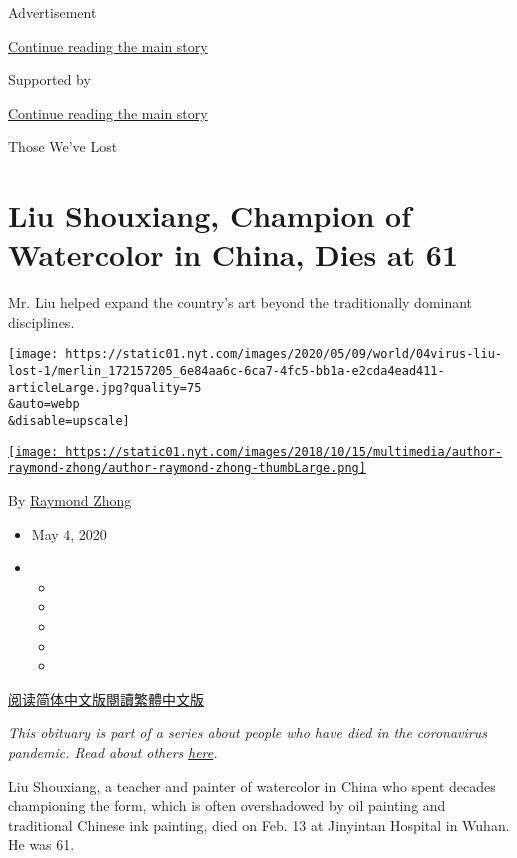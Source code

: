 Advertisement

\protect\hyperlink{after-top}{Continue reading the main story}

Supported by

\protect\hyperlink{after-sponsor}{Continue reading the main story}

Those We've Lost

\hypertarget{liu-shouxiang-champion-of-watercolor-in-china-dies-at-61}{%
\section{Liu Shouxiang, Champion of Watercolor in China, Dies at
61}\label{liu-shouxiang-champion-of-watercolor-in-china-dies-at-61}}

Mr. Liu helped expand the country's art beyond the traditionally
dominant disciplines.

\texttt{[image: https://static01.nyt.com/images/2020/05/09/world/04virus-liu-lost-1/merlin\_172157205\_6e84aa6c-6ca7-4fc5-bb1a-e2cda4ead411-articleLarge.jpg?quality=75\\\&auto=webp\\\&disable=upscale]}

\href{https://www.nytimes.com/by/raymond-zhong}{\texttt{[image: https://static01.nyt.com/images/2018/10/15/multimedia/author-raymond-zhong/author-raymond-zhong-thumbLarge.png]}}

By \href{https://www.nytimes.com/by/raymond-zhong}{Raymond Zhong}

\begin{itemize}
\item
  May 4, 2020
\item
  \begin{itemize}
  \item
  \item
  \item
  \item
  \item
  \end{itemize}
\end{itemize}

\href{https://cn.nytimes.com/obits/20200507/liu-shouxiang-coronavirus-dead/}{阅读简体中文版}\href{https://cn.nytimes.com/obits/20200507/liu-shouxiang-coronavirus-dead/zh-hant/}{閱讀繁體中文版}

\emph{This obituary is part of a series about people who have died in
the coronavirus pandemic. Read about others}
\href{https://www.nytimes.com/series/people-who-have-died-of-the-coronavirus}{\emph{here}}\emph{.}

Liu Shouxiang, a teacher and painter of watercolor in China who spent
decades championing the form, which is often overshadowed by oil
painting and traditional Chinese ink painting, died on Feb. 13 at
Jinyintan Hospital in Wuhan. He was 61.

